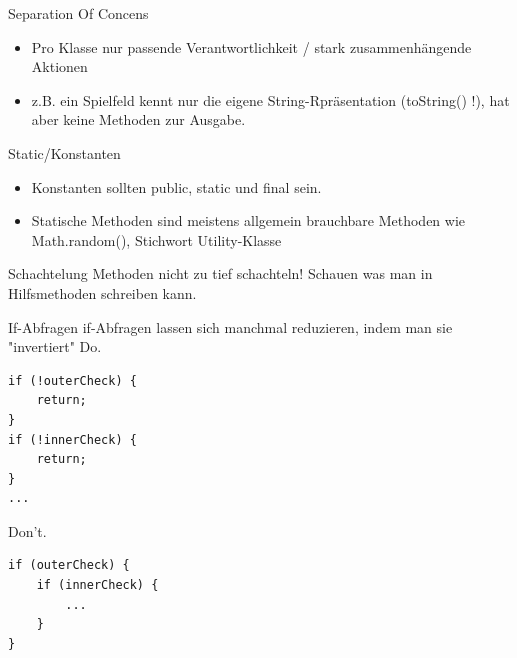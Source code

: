 \documentclass[aspectratio=169]{beamer}
\begin{document}
\begin{frame}
  \begin{block}{Separation Of Concens}
    \begin{itemize}
      \pause
      \item Pro Klasse nur passende Verantwortlichkeit / stark zusammenhängende Aktionen
      \pause
      \item z.B. ein Spielfeld kennt nur die eigene String-Rpräsentation (toString() !), hat aber keine Methoden zur Ausgabe.
    \end{itemize}
  \end{block}
  \pause
  \begin{block}{Static/Konstanten}
    \begin{itemize}
      \pause
      \item Konstanten sollten 
      \color{keywordcolor}public\color{FGround}, \color{keywordcolor}static \color{FGround} und \color{keywordcolor}final \color{FGround} sein.
      \pause
      \item Statische Methoden sind meistens allgemein brauchbare Methoden wie Math.random(), Stichwort Utility-Klasse
    \end{itemize}
  \end{block}
  \pause
  \begin{block}{Schachtelung}
    Methoden nicht zu tief schachteln! Schauen was man in Hilfsmethoden schreiben kann.
  \end{block}
\end{frame}

\begin{frame}[fragile]
  \begin{block}{If-Abfragen}
    \color{keywordcolor}if\color{FGround}-Abfragen lassen sich manchmal reduzieren, indem man sie "invertiert" \linebreak
    \pause
    \color{nicegreen}Do.\color{FGround}
    \begin{lstlisting}[numbers=none]
if (!outerCheck) { 
    return; 
} 
if (!innerCheck) { 
    return; 
} 
...
    \end{lstlisting}
    \pause
    \color{alertcolor}Don't.\color{FGround}
    \begin{lstlisting}[numbers=none]
if (outerCheck) { 
    if (innerCheck) { 
        ... 
    } 
}
    \end{lstlisting}
  \end{block}
\end{frame}
\end{document}
